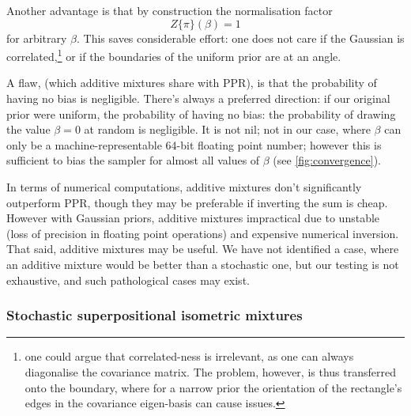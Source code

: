 \documentclass[usenatbib]{mnras}
\begin{document}
Another advantage is that by construction the normalisation factor
\[Z \{ \pi\}(\beta) = 1\] for arbitrary \(\beta\). This saves
considerable effort: one does not care if the Gaussian is
correlated,\footnote{one could argue that correlated-ness is irrelevant,
as one can always diagonalise the covariance matrix. The problem,
however, is thus transferred onto the boundary, where for a narrow
prior the orientation of the rectangle's edges in the covariance
eigen-basis can cause issues.} or if the boundaries of the
uniform prior are at an angle.

A flaw, (which additive mixtures share with PPR), is that the
probability of having no bias is negligible. There's always a
preferred direction: if our original prior were uniform, the
probability of having no bias: the probability of drawing the
value \(\beta=0\) at random is negligible. It is not nil; not in our
case, where \(\beta\) can only be a machine-representable 64-bit
floating point number; however this is sufficient to bias the
sampler for almost all values of \(\beta\) (see
\cref{fig:convergence}).

In terms of numerical computations, additive mixtures don't
significantly outperform PPR, though they may be preferable if
inverting the sum is cheap. However with Gaussian priors, additive
mixtures impractical due to unstable (loss of precision in floating
point operations) and expensive numerical inversion. That said,
additive mixtures may be useful. We have not identified a case, where
an additive mixture would be better than a stochastic one, but our
testing is not exhaustive, and such pathological cases may exist.


\subsubsection{Stochastic superpositional isometric mixtures}
\end{document}
